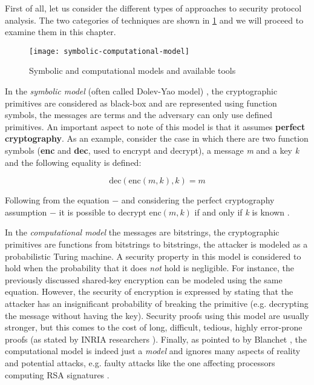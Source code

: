 First of all, let us consider the different types of approaches to security protocol analysis. The two categories of techniques are shown in \cref{fig:symbolic-computational-model} and we will proceed to examine them in this chapter.

\begin{figure}[t]
    \texttt{[image: symbolic-computational-model]}
    \centering
    \caption{Symbolic and computational models and available tools}
    \label{fig:symbolic-computational-model}
\end{figure}

In the \textit{symbolic model} (often called Dolev-Yao model) \cite{Dolev-Yao}, the cryptographic primitives are considered as black-box and are represented using function symbols, the messages are terms and the adversary can only use defined primitives. An important aspect to note of this model is that it assumes \textbf{perfect cryptography}. As an example, consider the case in which there are two function symbols (\textbf{enc} and \textbf{dec}, used to encrypt and decrypt), a message \textit{m} and a key \textit{k} and the following equality is defined:

\begin{equation}
\mbox{dec}\left(\mbox{enc}\left(m, k\right), k\right) = m
\end{equation}

Following from the equation $-$ and considering the perfect cryptography assumption $-$ it is possible to decrypt $\mbox{enc}\left(m, k\right)$ if and only if \textit{k} is known \cite{SymbolicComputationalBlanchet}.

In the \textit{computational model} the messages are bitstrings, the cryptographic primitives are functions from bitstrings to bitstrings, the attacker is modeled as a probabilistic Turing machine.
A security property in this model is considered to hold when the probability that it does \textit{not} hold is negligible. For instance, the previously discussed shared-key encryption can be modeled using the same equation. However, the security of encryption is expressed by stating that the attacker has an insignificant probability of breaking the primitive (e.g. decrypting the message without having the key). Security proofs using this model are usually stronger, but this comes to the cost of long, difficult, tedious, highly error-prone proofs (as stated by INRIA researchers \cite{ComputationalAnalysisCryptoSystemsINRIA}). Finally, as pointed to by Blanchet \cite{SymbolicComputationalBlanchet}, the computational model is indeed just a \textit{model} and ignores many aspects of reality and potential attacks, e.g. faulty attacks like the one affecting processors computing RSA signatures \cite{RSAFaultAttack}. 

